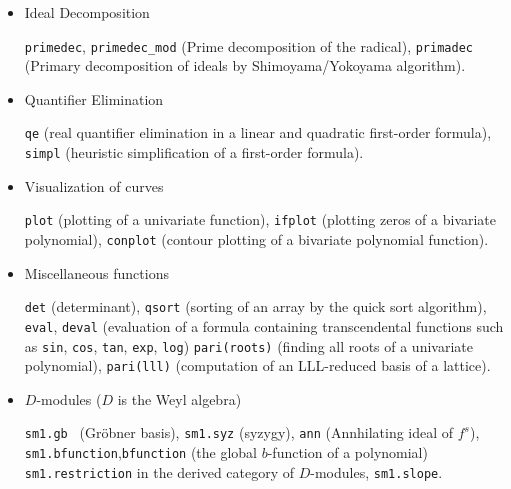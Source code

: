 \documentclass[12pt]{article}
\begin{document}
\begin{itemize}
{\tt dp\_gr\_main }, {\tt nd\_gr\_trace} (Groebner basis computation of a polynomial ideal
over the rationals by the trace lifting),
{\tt dp\_gr\_mod\_main }, {\tt nd\_gr} (Groebner basis over small finite fields),
{\tt tolex } (Modular change of ordering for a zero-dimensional ideal),
{\tt tolex\_gsl } (Modular rational univariate representation
for a zero-dimensional ideal),
{\tt dp\_f4\_main}, {\tt dp\_f4\_mod\_main}, {\tt nd\_f4} 
($F_4$ over the rationals and small finite fields).

\item Ideal Decomposition

{\tt primedec}, {\tt primedec\_mod} (Prime decomposition of the radical),
{\tt primadec} (Primary decomposition of ideals by Shimoyama/Yokoyama algorithm).

\item Quantifier Elimination

{\tt qe} (real quantifier elimination in a linear and
quadratic first-order formula),
{\tt simpl} (heuristic simplification of a first-order formula).

\item Visualization of curves

{\tt plot} (plotting of a univariate function),
{\tt ifplot} (plotting zeros of a bivariate polynomial),
{\tt conplot} (contour plotting of a bivariate polynomial function).

\item Miscellaneous functions

{\tt det} (determinant),
{\tt qsort} (sorting of an array by the quick sort algorithm),
{\tt eval}, {\tt deval} (evaluation of a formula containing transcendental functions
such as
{\tt sin}, {\tt cos}, {\tt tan}, {\tt exp},
{\tt log})
{\tt pari(roots)} (finding all roots of a univariate polynomial),
{\tt pari(lll)} (computation of an LLL-reduced basis of a lattice).

\item $D$-modules ($D$ is the Weyl algebra)

{\tt sm1.gb } (Gr\"obner basis),
{\tt sm1.syz} (syzygy),
{\tt ann} (Annhilating ideal of $f^s$),\\
{\tt sm1.bfunction},{\tt bfunction} (the global $b$-function of a polynomial)\\
{\tt sm1.restriction} in the derived category of $D$-modules,
{\tt sm1.slope}.


\end{itemize}
\end{document}
